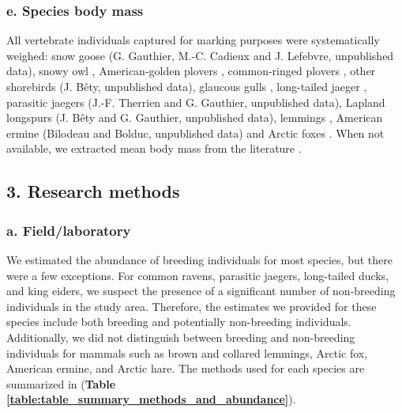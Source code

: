\documentclass[a4paper,twoside,12pt]{article}
\begin{document}
\subsubsection*{e. Species body mass}
All vertebrate individuals captured for marking purposes were systematically weighed: snow goose (G. Gauthier, M.-C. Cadieux and J. Lefebvre, unpublished data), snowy owl \citep{therrien2012, robillard2018}, American-golden plovers \citep{lamarre2021}, common-ringed plovers \citep{leandri2019}, other shorebirds (J. Bêty, unpublished data), glaucous gulls \citep{gauthier2015}, long-tailed jaeger \citep{seyer2019}, parasitic jaegers (J.-F. Therrien and G. Gauthier, unpublished data), Lapland longspurs (J. Bêty and G. Gauthier, unpublished data), lemmings \citep{gauthier2020lemmings}, American ermine (Bilodeau and Bolduc, unpublished data) and Arctic foxes \citep{lai2015}. When not available, we extracted mean body mass from the literature \citep{wilman2014}.
\newpage
                        
    \subsection*{3.  Research methods}
                \subsubsection*{a. Field/laboratory}
We estimated the abundance of breeding individuals for most species, but there were a few exceptions. For common ravens, parasitic jaegers, long-tailed ducks, and king eiders, we suspect the presence of a significant number of non-breeding individuals in the study area. Therefore, the estimates we provided for these species include both breeding and potentially non-breeding individuals. Additionally, we did not distinguish between breeding and non-breeding individuals for mammals such as brown and collared lemmings, Arctic fox, American ermine, and Arctic hare. The methods used for each species are summarized in (\textbf{Table \ref{table:table_summary_methods_and_abundance}}).
\end{document}
